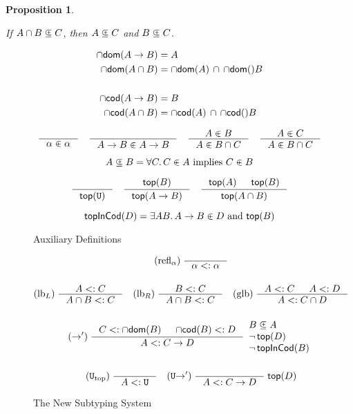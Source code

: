 \documentclass{article}
\newtheorem{proposition}[theorem]{Proposition}
\begin{document}
\begin{proposition}\label{prop:union-subset-inv}
 \item If $A \cap B \subsetpluseq C$, then $A \subsetpluseq C$ and $B \subsetpluseq C$. 
\end{proposition}


\begin{figure}[tbp]

  \begin{align*}
  \dom{A \to B} &= A \\
  \dom{A \cap B} &= \dom{A} \,\cap\, \dom {B} \\
  \\
  \cod{A \to B} &= B \\
  \cod{A \cap B} &= \cod{A} \,\cap\, \cod {B}
  \end{align*}

  \begin{gather*}
    \inference{}{\alpha \inside \alpha}  \quad
    \inference{}{A \to B \inside A \to B} \quad
    \inference{A \inside B}{A \inside B \cap C} \quad
    \inference{A \inside C}{A \inside B \cap C}
  \end{gather*}

  \[
     A \subsetpluseq B = \forall C.\, C \inplus A \text{ implies } C \inplus B
  \]

  \begin{gather*}
    \inference{}{\topP{\TOP}}
    \quad
    \inference{\topP{B}}{\topP{A \to B}}
    \quad
    \inference{\topP{A} & \topP{B}}{\topP{A \cap B}}
  \end{gather*}

  \[
  \mathsf{topInCod}(D) =
     \exists A B.\, A \to B \inplus D \text{ and } \mathsf{top}(B)  
  \]

  \caption{Auxiliary Definitions}
  \label{fig:aux}
\end{figure}


\begin{figure}[tbp]
  \begin{gather*}
    \text{(refl$_\alpha$)} \; \inference{}{\alpha <: \alpha} \\[3ex]
    \text{(lb$_L$)} \; \inference{A <: C}{A \cap B <: C} \quad
    \text{(lb$_R$)} \; \inference{B <: C}{A \cap B <: C} \quad
    \text{(glb)} \; \inference{A <: C & A <: D}{A <: C \cap D} \\[3ex]
    (\to') \; \inference{C <: \dom{B} & \cod{B} <: D }{A <: C \to D}
    \begin{array}{l}
      B \containedin A\\
      \neg\, \mathsf{top}(D) \\
      \neg \, \mathsf{topInCod}(B)
      \end{array}\\[3ex]
    (\TOP_{\mathrm{top}}) \; \inference{}{A <: \TOP} \quad
    (\TOP{\to}') \; \inference{}{A <: C \to D}\;\mathsf{top}(D)
  \end{gather*}
  \caption{The New Subtyping System}
  \label{fig:new-subtyping}
\end{figure}
\end{document}
